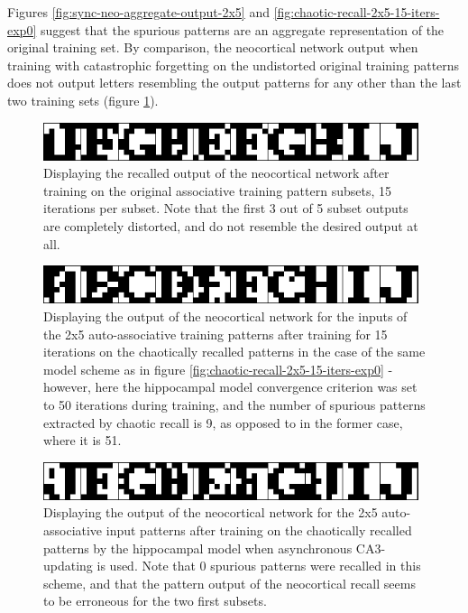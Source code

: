 Figures \ref{fig:sync-neo-aggregate-output-2x5} and \ref{fig:chaotic-recall-2x5-15-iters-exp0} suggest that the spurious patterns are an aggregate representation of the original training set. By comparison, the neocortical network output when training with catastrophic forgetting on the undistorted original training patterns does not output letters resembling the output patterns for any other than the last two training sets (figure \ref{fig:catastrophic-forgetting-2x5-neo-consolidation}).

\begin{figure}
    \centering
    \includegraphics[width=11cm]{fig/neo-consolidation/traditional-with-catastrophic-15-neo-iters}
    \caption{Displaying the recalled output of the neocortical network after training on the original associative training pattern subsets, 15 iterations per subset. Note that the first 3 out of 5 subset outputs are completely distorted, and do not resemble the desired output at all.}
    \label{fig:catastrophic-forgetting-2x5-neo-consolidation}
\end{figure}

\begin{figure}
    \centering
    \includegraphics[width=11cm]{fig/neo-consolidation/one-2x5-run-sync-50-iters-15-neo-iters}
    \caption{Displaying the output of the neocortical network for the inputs of the 2x5 auto-associative training patterns after training for 15 iterations on the chaotically recalled patterns in the case of the same model scheme as in figure \ref{fig:chaotic-recall-2x5-15-iters-exp0} - however, here the hippocampal model convergence criterion was set to 50 iterations during training, and the number of spurious patterns extracted by chaotic recall is 9, as opposed to in the former case, where it is 51.}
    \label{fig:one-2x5-run-sync-50-iters-15-neo-iters}
\end{figure}

\begin{figure}
    \centering
    \includegraphics[width=11cm]{fig/neo-consolidation/one-2x5-run-async-tm1-15-iters-15-neo-iters}
    \caption{Displaying the output of the neocortical network for the 2x5 auto-associative input patterns after training on the chaotically recalled patterns by the hippocampal model when asynchronous CA3-updating is used. Note that 0 spurious patterns were recalled in this scheme, and that the pattern output of the neocortical recall seems to be erroneous for the two first subsets.}
    \label{fig:one-2x5-run-async-tm1-15-iters-15-neo-iters}
\end{figure}

